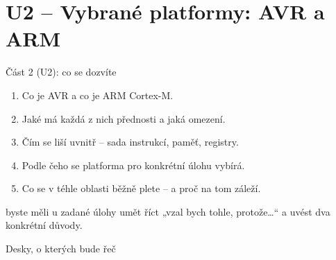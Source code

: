 \documentclass[12pt,aspectratio=169]{beamer}
\begin{document}
\section{U2 -- Vybrané platformy: AVR a ARM}

\begin{keyframe}{Část 2 (U2): co se dozvíte}
  \small
  \begin{enumerate}\itemsep2pt
    \item Co je AVR a co je ARM Cortex-M.
    \item Jaké má každá z nich přednosti a jaká omezení.
    \item Čím se liší uvnitř -- sada instrukcí, paměť, registry.
    \item Podle čeho se platforma pro konkrétní úlohu vybírá.
    \item Co se v téhle oblasti běžně plete -- a proč na tom záleží.
  \end{enumerate}
  \vfill
   byste měli u zadané úlohy umět říct „vzal bych tohle,
  protože\dots`` a uvést dva konkrétní důvody.
\end{keyframe}

\begin{frame}{Desky, o kterých bude řeč}
  \vspace{-2mm}
  \begin{center}
  \end{center}
\end{frame}
\end{document}

